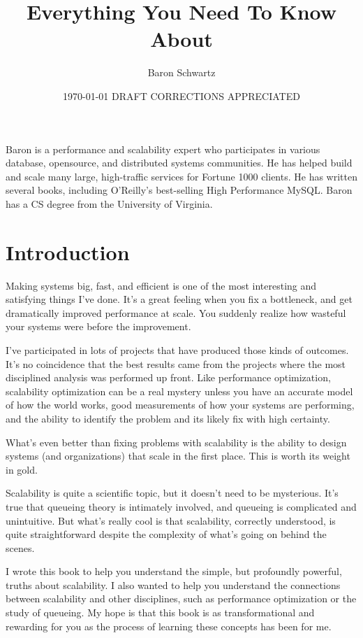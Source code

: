 \documentclass{vivid_layout}
\title{Everything You Need To Know About}{Scalability - DRAFT}
\date{\today{} \textbullet{} DRAFT \textbullet{} CORRECTIONS APPRECIATED}
\author{Baron Schwartz}{img/baron}
\begin{document}
\maketitle		%
\begin{bio}		%
Baron is a performance and scalability expert who participates in various
database, opensource, and distributed systems communities. He has helped build
and scale many large, high-traffic services for Fortune 1000 clients. He has
written several books, including O'Reilly's best-selling High Performance MySQL.
Baron has a CS degree from the University of Virginia.
\end{bio}
\tableofcontents	%

\section{Introduction}

Making systems big, fast, and efficient is one of the most interesting and
satisfying things I've done. It's a great feeling when you fix a bottleneck, and
get dramatically improved performance at scale. You suddenly realize how
wasteful your systems were before the improvement.

I've participated in lots of projects that have produced those kinds of outcomes.
It's no coincidence that the best results came from the projects where the most
disciplined analysis was performed up front. Like performance optimization,
scalability optimization can be a real mystery unless you have an accurate model
of how the world works, good measurements of how your systems are performing,
and the ability to identify the problem and its likely fix with high certainty.

What's even better than fixing problems with scalability is the ability to
design systems (and organizations) that scale in the first place. This is worth
its weight in gold.

Scalability is quite a scientific topic, but it doesn't need to be mysterious.
It's true that queueing theory is intimately involved, and queueing is
complicated and unintuitive. But what's really cool is that scalability,
correctly understood, is quite straightforward despite the complexity of what's
going on behind the scenes.

I wrote this book to help you understand the simple, but profoundly
powerful, truths about scalability. I also wanted to help you understand the
connections between scalability and other disciplines, such as performance
optimization or the study of queueing. My hope is that this book is as
transformational and rewarding for you as the process of learning these concepts
has been for me.
\end{document}
